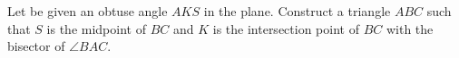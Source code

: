 Let be given an obtuse angle $AKS$ in the plane. Construct a triangle $ABC$ such that $S$ is the midpoint of $BC$ and $K$ is the intersection point of $BC$ with the bisector of  $\angle BAC$.
